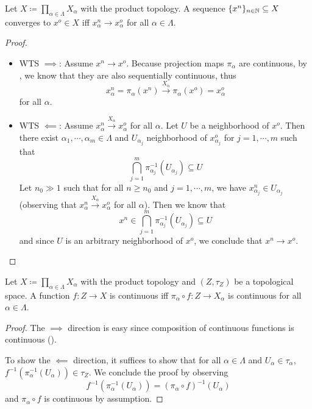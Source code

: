 \documentclass{techreport}
\begin{document}
\begin{lemma}\label{Lem:ProdTopSeqConvergeIffEveryAxisConverge}
	Let $X \coloneqq \prod_{\alpha \in \Lambda} X_\alpha$ with the product topology.
	A sequence $\{x^n\}_{n \in \mathbb{N}} \subseteq X$ converges to $x^o \in X$ iff $x^n_\alpha \rightarrow x^o_\alpha$ for all $\alpha \in \Lambda$.
\end{lemma}
\begin{proof}
	\begin{itemize}
		\item WTS $\implies$: Assume $x^n \rightarrow x^o$.
		Because projection maps $\pi_\alpha$ are continuous, by , we know that they are also sequentially continuous, thus
		\[
		x^n_\alpha = \pi_\alpha(x^n) \xrightarrow{X_\alpha} \pi_\alpha(x^o) = x^o_\alpha
		\]
		for all $\alpha$.
		
		\item WTS $\impliedby$: Assume $x^n_\alpha \xrightarrow{X_\alpha} x^o_\alpha$ for all $\alpha$.
		Let $U$ be a neighborhood of $x^o$.
		Then there exist $\alpha_1,\cdots,\alpha_m \in \Lambda$ and  $U_{\alpha_j}$ neighborhood of $x^o_{\alpha_j}$ for $j=1,\cdots,m$ such that
		\[
		\bigcap_{j=1}^m \pi_{\alpha_j}^{-1}(U_{\alpha_j}) \subseteq U
		\]
		Let $n_0 \gg 1$ such that for all $n \ge n_0$ and $j=1,\cdots,m$, we have $x^n_{\alpha_j} \in U_{\alpha_j}$ (observing that $x^n_\alpha \xrightarrow{X_\alpha} x^o_\alpha$ for all $\alpha$).
		Then we know that
		\[
		x^n \in \bigcap_{j=1}^m \pi_{\alpha_j}^{-1}(U_{\alpha_j}) \subseteq U
		\]
		and since $U$ is an arbitrary neighborhood of $x^o$, we conclude that $x^n \rightarrow x^o$.
	\end{itemize}
\end{proof}

\begin{lemma}\label{Lem:ProdTopContFuncIffContEveryAxis}
	Let $X \coloneqq \prod_{\alpha \in \Lambda} X_\alpha$ with the product topology and $(Z,\tau_Z)$ be a topological space.
	A function $f :Z \to X$ is continuous iff $\pi_\alpha \circ f : Z \to X_\alpha$ is continuous for all $\alpha \in \Lambda$.
\end{lemma}
\begin{proof}
	The $\implies$ direction is easy since composition of continuous functions is continuous ().
	
	To show the $\impliedby$ direction, it suffices to show that for all $\alpha \in \Lambda$ and $U_\alpha \in \tau_\alpha$, $f^{-1}(\pi_\alpha^{-1}(U_\alpha)) \in \tau_Z$.
	We conclude the proof by observing
	\[
	f^{-1}(\pi_\alpha^{-1}(U_\alpha)) = (\pi_\alpha \circ f)^{-1}(U_\alpha)
	\]
	and $\pi_\alpha \circ f$ is continuous by assumption.
\end{proof}
\end{document}
